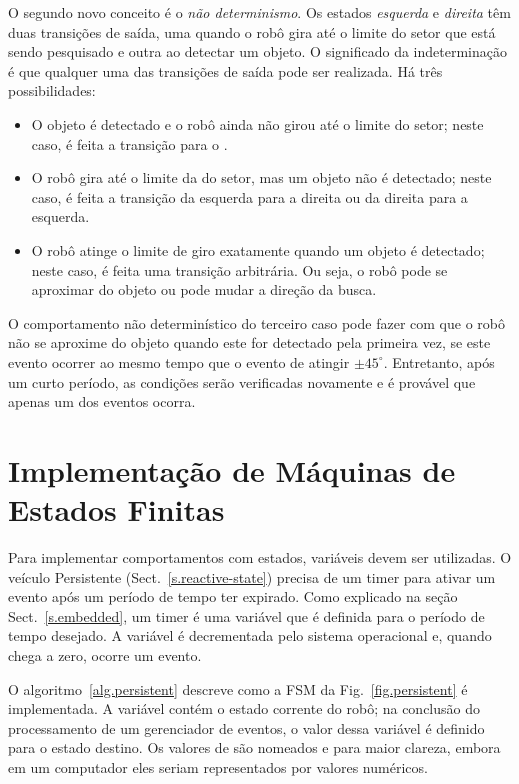 O segundo novo conceito é o \emph{não determinismo}. Os estados \emph{esquerda} e \emph{direita} têm duas transições de saída, uma quando o robô gira até o limite do setor que está sendo pesquisado e outra ao detectar um objeto. O significado da indeterminação é que qualquer uma das transições de saída pode ser realizada. Há três possibilidades:
\begin{itemize}
\item O objeto é detectado e o robô ainda não girou até o limite do setor; neste caso, é feita a transição para o .
\item O robô gira até o limite da do setor, mas um objeto não é detectado; neste caso, é feita a transição da esquerda para a direita ou da direita para a esquerda.
\item O robô atinge o limite de giro exatamente quando um objeto é detectado; neste caso, é feita uma transição arbitrária. Ou seja, o robô pode se aproximar do objeto ou pode mudar a direção da busca.
\end{itemize}
O comportamento não determinístico do terceiro caso pode fazer com que o robô não se aproxime do objeto quando este for detectado pela primeira vez, se este evento ocorrer ao mesmo tempo que o evento de atingir $\pm45^{\circ}$. Entretanto, após um curto período, as condições serão verificadas novamente e é provável que apenas um dos eventos ocorra.

\section{Implementação de Máquinas de Estados Finitas}\label{s.fsm-implementation}

Para implementar comportamentos com estados, variáveis devem ser utilizadas. O veículo Persistente (Sect.~\ref{s.reactive-state}) precisa de um timer para ativar um evento após um período de tempo ter expirado. Como explicado na seção Sect.~\ref{s.embedded}, um timer é uma variável que é definida para o período de tempo desejado. A variável é decrementada pelo sistema operacional e, quando chega a zero, ocorre um evento.

O algoritmo~\ref{alg.persistent} descreve como a FSM da Fig.~\ref{fig.persistent} é implementada. A variável  contém o estado corrente do robô; na conclusão do processamento de um gerenciador de eventos, o valor dessa variável é definido para o estado destino. Os valores de  são nomeados  e  para maior clareza, embora em um computador eles seriam representados por valores numéricos.

